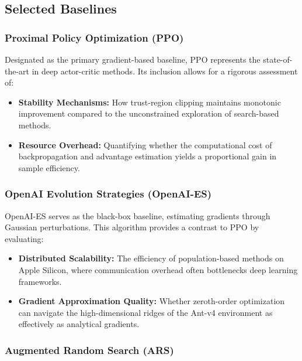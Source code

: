 \subsection{Selected Baselines}

\subsubsection{Proximal Policy Optimization (PPO)}

Designated as the primary gradient-based baseline, PPO represents the state-of-the-art in deep actor-critic methods. Its inclusion allows for a rigorous assessment of:

\begin{itemize}
    \item \textbf{Stability Mechanisms:} How trust-region clipping maintains monotonic improvement compared to the unconstrained exploration of search-based methods.
    
    \item \textbf{Resource Overhead:} Quantifying whether the computational cost of backpropagation and advantage estimation yields a proportional gain in sample efficiency.
\end{itemize}

\subsubsection{OpenAI Evolution Strategies (OpenAI-ES)}

OpenAI-ES serves as the black-box baseline, estimating gradients through Gaussian perturbations. This algorithm provides a contrast to PPO by evaluating:

\begin{itemize}
    \item \textbf{Distributed Scalability:} The efficiency of population-based methods on Apple Silicon, where communication overhead often bottlenecks deep learning frameworks.
    
    \item \textbf{Gradient Approximation Quality:} Whether zeroth-order optimization can navigate the high-dimensional ridges of the Ant-v4 environment as effectively as analytical gradients.
\end{itemize}

\subsubsection{Augmented Random Search (ARS)}

